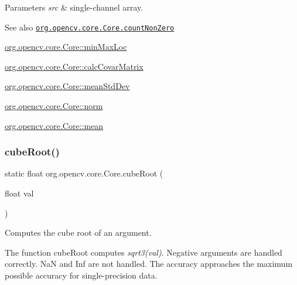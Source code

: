 \begin{DoxyParams}{Parameters}
{\em src} & single-\/channel array.\\
\hline
\end{DoxyParams}
\begin{DoxySeeAlso}{See also}
\href{http://docs.opencv.org/modules/core/doc/operations_on_arrays.html#countnonzero}{\tt org.\+opencv.\+core.\+Core.\+count\+Non\+Zero} 

\mbox{\hyperlink{classorg_1_1opencv_1_1core_1_1_core_a87987114238d2094a01395f12d6a9367}{org.\+opencv.\+core.\+Core\+::min\+Max\+Loc}} 

\mbox{\hyperlink{classorg_1_1opencv_1_1core_1_1_core_afebca901f30f80a2a6db7a67cc2afb0a}{org.\+opencv.\+core.\+Core\+::calc\+Covar\+Matrix}} 

\mbox{\hyperlink{classorg_1_1opencv_1_1core_1_1_core_af8d7fbb33c11fbf6115d4c242dbbb5b3}{org.\+opencv.\+core.\+Core\+::mean\+Std\+Dev}} 

\mbox{\hyperlink{classorg_1_1opencv_1_1core_1_1_core_a282aac8c7806f10f75738bf8db3af7a8}{org.\+opencv.\+core.\+Core\+::norm}} 

\mbox{\hyperlink{classorg_1_1opencv_1_1core_1_1_core_aff700e66b1cef1a74cfd94d405369edf}{org.\+opencv.\+core.\+Core\+::mean}} 
\end{DoxySeeAlso}
\mbox{\label{classorg_1_1opencv_1_1core_1_1_core_a08e2ce54e07e80ac946866bf205d9333}} 
\subsubsection{\texorpdfstring{cube\+Root()}{cubeRoot()}}
{\footnotesize\ttfamily static float org.\+opencv.\+core.\+Core.\+cube\+Root (\begin{DoxyParamCaption}\item[{float}]{val }\end{DoxyParamCaption})\hspace{0.3cm}{\ttfamily [static]}}

Computes the cube root of an argument.

The function {\ttfamily cube\+Root} computes {\itshape sqrt3(val)}. Negative arguments are handled correctly. NaN and Inf are not handled. The accuracy approaches the maximum possible accuracy for single-\/precision data.


